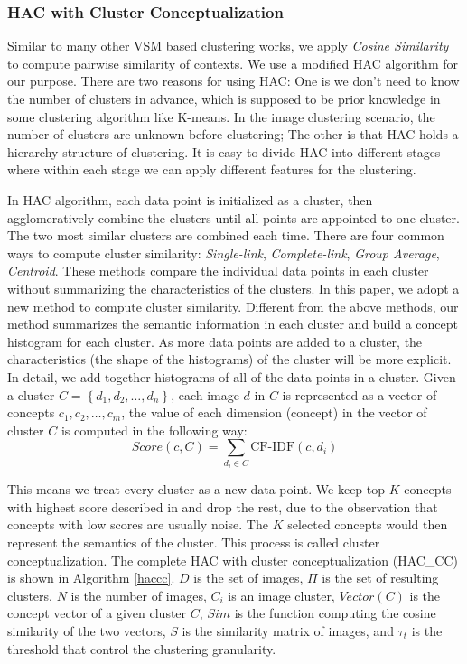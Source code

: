 \subsubsection{HAC with Cluster Conceptualization}
Similar to many other VSM based
clustering works, we apply \emph{Cosine Similarity} to compute
pairwise similarity of contexts.
We use a modified HAC algorithm for our purpose.
There are two reasons for using HAC:
One is we don't need to know the number of clusters in advance,
which is supposed to be prior knowledge in some clustering algorithm like K-means.
In the image clustering scenario, the number of clusters are unknown before clustering;
The other is that HAC holds a hierarchy structure of clustering.
It is easy to divide HAC into different stages where within each stage
we can apply different features for the clustering.

In HAC algorithm, each data point is initialized as a cluster,
then agglomeratively combine the clusters
until all points are appointed to one cluster.
The two most similar clusters are combined each time.
There are four common ways to compute cluster similarity:
\emph{Single-link}, \emph{Complete-link},
\emph{Group Average}, \emph{Centroid}.
These methods compare the individual data points in each
cluster without summarizing the characteristics of the clusters.
In this paper, we adopt a new method to compute cluster similarity.
Different from the above methods,
our method summarizes the semantic information in each cluster and
build a concept histogram for each cluster.
As more data points are added to a cluster,
the characteristics (the shape of the histograms)
of the cluster will be more explicit.
In detail, we add together histograms of all of the data points in a cluster.
Given a cluster $C=\left\{d_1, d_2, \ldots, d_n\right\}$,
each image $d$ in $C$ is represented
as a vector of concepts ${c_1, c_2, \ldots, c_m}$,
the value of each dimension (concept) in
the vector of cluster $C$ is computed in the following way:
\begin{equation}
\label{comv}
Score(c, C)=\sum_{d_i\in C}{\mbox{CF-IDF}(c, d_i)}
\end{equation}

This means we treat every cluster as a new data point.
We keep top $K$ concepts with highest score described in 
and drop the rest, due to the observation that
concepts with low scores are usually noise.
The $K$ selected concepts would then represent the semantics of the cluster.
This process is called cluster conceptualization.
The complete HAC with cluster conceptualization (HAC\_CC) is shown
in Algorithm \ref{haccc}. $D$ is the set of images, $\Pi$ is the set of resulting clusters,
$N$ is the number of images, $C_i$ is an image
cluster, $Vector(C)$ is the concept vector of a given cluster $C$,
$Sim$ is the function computing the cosine similarity of the two vectors,
$S$ is the similarity matrix of images,
and $\tau_t$ is the threshold that control the clustering granularity.

